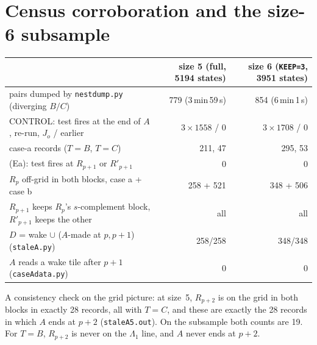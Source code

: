 \documentclass[11pt]{article}
\theoremstyle{definition}\newtheorem{definition}[theorem]{Definition}\newtheorem{remark}[theorem]{Remark}
\begin{document}
\section{Census corroboration and the size-6 subsample}\label{sec:six}
\begin{center}\small\begin{tabular}{lrr}\toprule
& size 5 (full, 5194 states) & size 6 (\texttt{KEEP=3}, 3951 states)\\\midrule
pairs dumped by \texttt{nestdump.py} (diverging $B/C$) & 779 (3\,min\,59\,s) & 854 (6\,min\,1\,s)\\
CONTROL: test fires at the end of $A$, re-run, $J_o$ / earlier & $3\times1558$ / 0 & $3\times1708$ / 0\\
case-a records ($T=B$, $T=C$) & 211, 47 & 295, 53\\
(Ea): test fires at $R_{p+1}$ or $R'_{p+1}$ & 0 & 0\\
$R_p$ off-grid in both blocks, case a + case b & 258 + 521 & 348 + 506\\
$R_{p+1}$ keeps $R_p$'s $s$-complement block, $R'_{p+1}$ keeps the other & all & all\\
$D$ = wake $\cup$ ($A$-made at $p,p+1$) (\texttt{staleA.py}) & 258/258 & 348/348\\
$A$ reads a wake tile after $p+1$ (\texttt{caseAdata.py}) & 0 & 0\\\bottomrule
\end{tabular}\end{center}
A consistency check on the grid picture: at size~5, $R_{p+2}$ is on the grid in both blocks in exactly 28 records, all with $T=C$, and these are exactly the 28 records in which $A$ ends at $p+2$ (\texttt{staleA5.out}). On the subsample both counts are 19. For $T=B$, $R_{p+2}$ is never on the $\Lambda_1$ line, and $A$ never ends at $p+2$.
\end{document}
